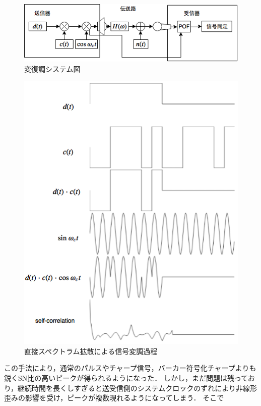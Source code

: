\begin{figure}[p]\centering
  \hspace{-2mm}\includegraphics[clip,width=1.1\hsize]{img/DME2.png}
  \caption{変復調システム図}\label{fig:DME2}
\end{figure}

\begin{figure}[p]\centering
  \hspace{-2mm}\includegraphics[clip,width=1.1\hsize]{img/DSSS.png}
  \caption{直接スペクトラム拡散による信号変調過程}\label{fig:DSSS}
\end{figure}

この手法により，通常のパルスやチャープ信号，バーカー符号化チャープよりも鋭くSN比の高いピークが得られるようになった．
しかし，まだ問題は残っており，継続時間を長くしすぎると送受信側のシステムクロックのずれにより非線形歪みの影響を受け，ピークが複数現れるようになってしまう．
そこで



